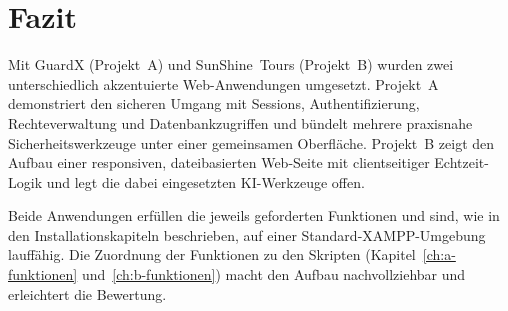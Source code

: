 \chapter{Fazit}
\label{ch:fazit}

Mit GuardX (Projekt~A) und SunShine~Tours (Projekt~B) wurden zwei unterschiedlich akzentuierte
Web-Anwendungen umgesetzt. Projekt~A demonstriert den sicheren Umgang mit Sessions,
Authentifizierung, Rechteverwaltung und Datenbankzugriffen und b\"undelt mehrere praxisnahe
Sicherheitswerkzeuge unter einer gemeinsamen Oberfl\"ache. Projekt~B zeigt den Aufbau einer
responsiven, dateibasierten Web-Seite mit clientseitiger Echtzeit-Logik und legt die dabei
eingesetzten KI-Werkzeuge offen.

Beide Anwendungen erf\"ullen die jeweils geforderten Funktionen und sind, wie in den
Installationskapiteln beschrieben, auf einer Standard-XAMPP-Umgebung lauff\"ahig. Die Zuordnung
der Funktionen zu den Skripten (Kapitel~\ref{ch:a-funktionen} und~\ref{ch:b-funktionen}) macht den
Aufbau nachvollziehbar und erleichtert die Bewertung.
